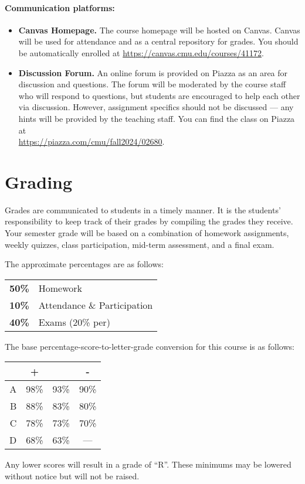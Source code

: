 \documentclass[12pt]{scrartcl}
\begin{document}
\paragraph{Communication platforms:}
\begin{itemize}
\item \textbf{Canvas Homepage.} 
The course homepage will be hosted on Canvas. 
Canvas will be used for attendance and as a central repository for grades. 
You should be automatically enrolled at \url{https://canvas.cmu.edu/courses/41172}.
\item \textbf{Discussion Forum.} 
An online forum is provided on Piazza as an area for discussion and questions. 
The forum will be moderated by the course staff who will respond to questions, 
but students are encouraged to help each other via discussion. 
However, assignment specifics should not be discussed --- 
any hints will be provided by the teaching staff. 
You can find the class on Piazza at\\ \url{https://piazza.com/cmu/fall2024/02680}.
\end{itemize}

\section{Grading}

Grades are communicated to students in a timely manner. 
It is the students’ responsibility to keep track of their grades by compiling the grades they receive. 
Your semester grade will be based on a combination of homework assignments, weekly quizzes, class participation,  mid-term assessment, and a final exam. 

The approximate percentages are as follows:
\begin{center}
\begin{tabular}{rl}
\textbf{50\% } & Homework\\
\textbf{10\% } & Attendance \& Participation\\
\textbf{40\% } & Exams (20\% per)\\
\end{tabular}
\end{center}

The base percentage-score-to-letter-grade conversion for this course is as follows: 

\begin{center}
\begin{tabular}{r|ccc}
 & + & & -\\
 \hline
A & 98\% & 93\% & 90\%\\
B & 88\% & 83\% & 80\%\\
C & 78\% & 73\% & 70\%\\
D & 68\% & 63\% & ---\\
\end{tabular}
\end{center}
Any lower scores will result in a grade of ``R''.
These minimums may be lowered without notice but will not be raised. 
\end{document}
